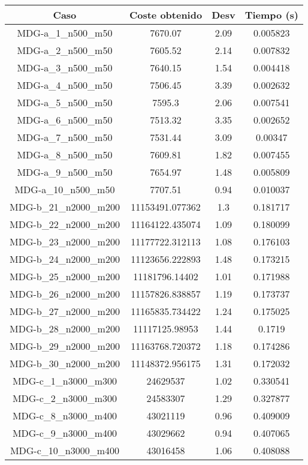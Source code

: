 \documentclass{article}
\begin{document}
\begin{table}[H]
	\centering
	\begin{tabular}{|cccc|}
		\hline
		Caso & Coste obtenido & Desv & Tiempo (s)\\ \hline
		MDG-a\_1\_n500\_m50 & 7670.07 & 2.09 & 0.005823\\
		MDG-a\_2\_n500\_m50 & 7605.52 & 2.14 & 0.007832\\
		MDG-a\_3\_n500\_m50 & 7640.15 & 1.54 & 0.004418\\
		MDG-a\_4\_n500\_m50 & 7506.45 & 3.39 & 0.002632\\
		MDG-a\_5\_n500\_m50 & 7595.3 & 2.06 & 0.007541\\
		MDG-a\_6\_n500\_m50 & 7513.32 & 3.35 & 0.002652\\
		MDG-a\_7\_n500\_m50 & 7531.44 & 3.09 & 0.00347\\
		MDG-a\_8\_n500\_m50 & 7609.81 & 1.82 & 0.007455\\
		MDG-a\_9\_n500\_m50 & 7654.97 & 1.48 & 0.005809\\
		MDG-a\_10\_n500\_m50 & 7707.51 & 0.94 & 0.010037\\
		MDG-b\_21\_n2000\_m200 & 11153491.077362 & 1.3 & 0.181717\\
		MDG-b\_22\_n2000\_m200 & 11164122.435074 & 1.09 & 0.180099\\
		MDG-b\_23\_n2000\_m200 & 11177722.312113 & 1.08 & 0.176103\\
		MDG-b\_24\_n2000\_m200 & 11123656.222893 & 1.48 & 0.173215\\
		MDG-b\_25\_n2000\_m200 & 11181796.14402 & 1.01 & 0.171988\\
		MDG-b\_26\_n2000\_m200 & 11157826.838857 & 1.19 & 0.173737\\
		MDG-b\_27\_n2000\_m200 & 11165835.734422 & 1.24 & 0.175025\\
		MDG-b\_28\_n2000\_m200 & 11117125.98953 & 1.44 & 0.1719\\
		MDG-b\_29\_n2000\_m200 & 11163768.720372 & 1.18 & 0.174286\\
		MDG-b\_30\_n2000\_m200 & 11148372.956175 & 1.31 & 0.172032\\
		MDG-c\_1\_n3000\_m300 & 24629537 & 1.02 & 0.330541\\
		MDG-c\_2\_n3000\_m300 & 24583307 & 1.29 & 0.327877\\
		MDG-c\_8\_n3000\_m400 & 43021119 & 0.96 & 0.409009\\
		MDG-c\_9\_n3000\_m400 & 43029662 & 0.94 & 0.407065\\
		MDG-c\_10\_n3000\_m400 & 43016458 & 1.06 & 0.408088\\

\end{tabular}
\end{table}
\end{document}
